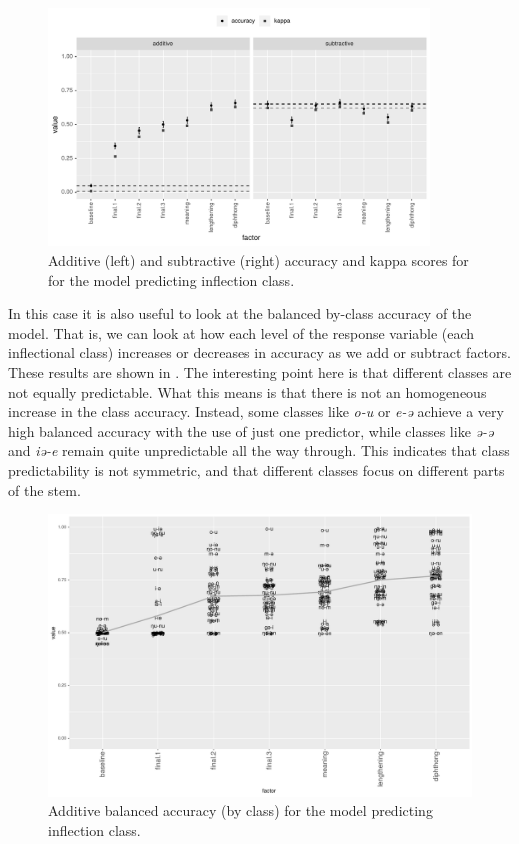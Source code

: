 \begin{figure}[!htpb]
  \centering
  \includegraphics[width=0.9\textwidth]{./figures/kasem/p-fi-class-sg-overall.pdf}
    \caption{Additive (left) and subtractive (right) accuracy and kappa scores for for the model predicting inflection class.}\label{fig:overall-fi-class-sg}
\end{figure}

In this case it is also useful to look at the balanced by-class accuracy of the model. That is, we can look at how each level of the response variable (each inflectional class) increases or decreases in accuracy as we add or subtract factors. These results are shown in . The interesting point here is that different classes are not equally predictable. What this means is that there is not an homogeneous increase in the class accuracy. Instead, some classes like \textit{o-u} or \textit{e-ə} achieve a very high balanced accuracy with the use of just one predictor, while classes like \textit{ə-ə} and \textit{iə-e} remain quite unpredictable all the way through. This indicates that class predictability is not symmetric, and that different classes focus on different parts of the stem.

\begin{figure}
  \centering
  \includegraphics[width=0.85\textheight]{./figures/kasem/p-fi-class-sg-byclass.pdf}
  \caption{Additive balanced accuracy (by class) for the model predicting inflection class.}\label{fig:byclass-fi-class-sg}
\end{figure}


